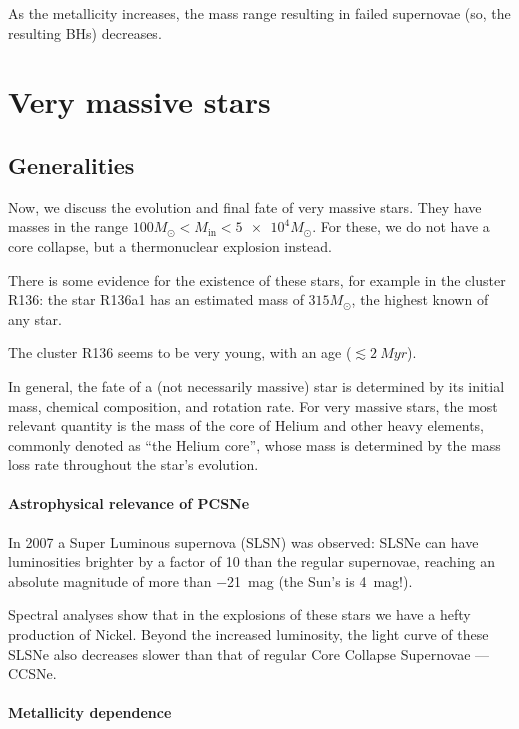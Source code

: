 \documentclass[main.tex]{subfiles}
\begin{document}
As the metallicity increases, the mass range resulting in failed supernovae (so, the resulting BHs) decreases. 

\section{Very massive stars}

\subsection{Generalities}

Now, we discuss the evolution and final fate of very massive stars. 
They have masses in the range \(100 M_{\odot} < M _{\text{in}} < \num{5e4}M_{\odot}\). 
For these, we do not have a core collapse, but a thermonuclear explosion instead. 

There is some evidence for the existence of these stars, for example in the cluster R136: the star R136a1 has an estimated mass of \(315M_{\odot}\), the highest known of any star. 

The cluster R136 seems to be very young, with an age (\(\lesssim \SI{2}{Myr}\)). 

In general, the fate of a (not necessarily massive) star is determined by its initial mass, chemical composition, and rotation rate.
For very massive stars, the most relevant quantity is the mass of the core of Helium and other heavy elements, commonly denoted as ``the Helium core'', whose mass is determined by the mass loss rate throughout the star's evolution.

\paragraph{Astrophysical relevance of PCSNe}

In 2007 a Super Luminous supernova (SLSN) was observed: SLSNe can have luminosities brighter by a factor of 10 than the regular supernovae, reaching an absolute magnitude of more than \SI{-21}{mag} (the Sun's is \SI{4}{mag}!). 

Spectral analyses show that in the explosions of these stars we have a hefty production of Nickel.
Beyond the increased luminosity, the light curve of these SLSNe also decreases slower than that of regular Core Collapse Supernovae --- CCSNe.

\paragraph{Metallicity dependence}
\end{document}
